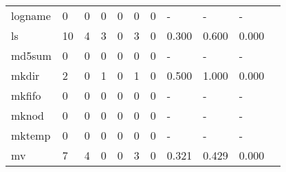 \begin{longtable}{lp{1.10cm}p{1.10cm}p{1.10cm}p{1.10cm}p{1.10cm}p{1.10cm}p{1.10cm}p{1.10cm}p{1.10cm}p{1.10cm}}
logname   &                      0 &                                  0 &                                 0 &                                0 &                                 0 &                               0 &                              - &                                     - &                                   - \\
ls        &                     10 &                                  4 &                                 3 &                                0 &                                 3 &                               0 &                          0.300 &                                 0.600 &                               0.000 \\
md5sum    &                      0 &                                  0 &                                 0 &                                0 &                                 0 &                               0 &                              - &                                     - &                                   - \\
mkdir     &                      2 &                                  0 &                                 1 &                                0 &                                 1 &                               0 &                          0.500 &                                 1.000 &                               0.000 \\
mkfifo    &                      0 &                                  0 &                                 0 &                                0 &                                 0 &                               0 &                              - &                                     - &                                   - \\
mknod     &                      0 &                                  0 &                                 0 &                                0 &                                 0 &                               0 &                              - &                                     - &                                   - \\
mktemp    &                      0 &                                  0 &                                 0 &                                0 &                                 0 &                               0 &                              - &                                     - &                                   - \\
mv        &                      7 &                                  4 &                                 0 &                                0 &                                 3 &                               0 &                          0.321 &                                 0.429 &                               0.000 \\

\end{longtable}
